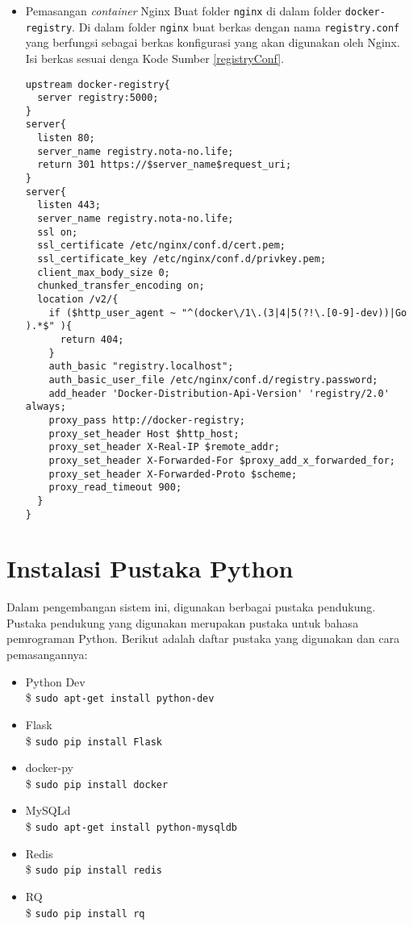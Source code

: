 \begin{itemize}
    \item Pemasangan \textit{container} Nginx
    	Buat folder \texttt{nginx} di dalam folder \texttt{docker-registry}. Di dalam folder \texttt{nginx} buat berkas dengan nama \texttt{registry.conf} yang berfungsi sebagai berkas konfigurasi yang akan digunakan oleh Nginx. Isi berkas sesuai denga Kode Sumber \ref{registryConf}.
        \begin{lstlisting}[frame=single,tabsize=2,breaklines,caption={Isi Berkas registry.conf},label=registryConf, captionpos=b]
upstream docker-registry{
  server registry:5000;
}
server{
  listen 80;
  server_name registry.nota-no.life;
  return 301 https://$server_name$request_uri;
}
server{
  listen 443;
  server_name registry.nota-no.life;
  ssl on;
  ssl_certificate /etc/nginx/conf.d/cert.pem;
  ssl_certificate_key /etc/nginx/conf.d/privkey.pem;
  client_max_body_size 0;
  chunked_transfer_encoding on;
  location /v2/{
    if ($http_user_agent ~ "^(docker\/1\.(3|4|5(?!\.[0-9]-dev))|Go ).*$" ){
      return 404;
    }
    auth_basic "registry.localhost";
    auth_basic_user_file /etc/nginx/conf.d/registry.password;
    add_header 'Docker-Distribution-Api-Version' 'registry/2.0' always;
    proxy_pass http://docker-registry;
    proxy_set_header Host $http_host;
    proxy_set_header X-Real-IP $remote_addr;
    proxy_set_header X-Forwarded-For $proxy_add_x_forwarded_for;
    proxy_set_header X-Forwarded-Proto $scheme;
    proxy_read_timeout 900;
  }
}
		\end{lstlisting}
        
    \end{itemize}

\section*{Instalasi Pustaka Python} \label{install:pythonlibrary}
	Dalam pengembangan sistem ini, digunakan berbagai pustaka pendukung. Pustaka pendukung yang digunakan merupakan pustaka untuk bahasa pemrograman Python. Berikut adalah daftar pustaka yang digunakan dan cara pemasangannya:
    \begin{itemize}
    \item Python Dev \\
    	\$ \texttt{sudo apt-get install python-dev}
    \item Flask \\
    	\$ \texttt{sudo pip install Flask}
    \item docker-py \\
    	\$ \texttt{sudo pip install docker}
    \item MySQLd \\
    	\$ \texttt{sudo apt-get install python-mysqldb}
    \item Redis \\
    	\$ \texttt{sudo pip install redis}
    \item RQ \\
    	\$ \texttt{sudo pip install rq}
    \end{itemize}

